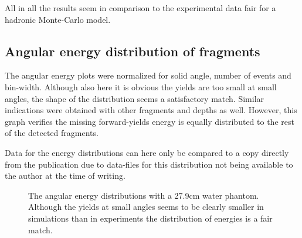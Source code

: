 All in all the results seem in comparison to the experimental data fair for a hadronic Monte-Carlo model.

\subsection{Angular energy distribution of fragments}
The angular energy plots were normalized for solid angle, number of events and bin-width. Although also here it is obvious the yields are too small at small angles, the shape of the distribution seems a satisfactory match. Similar indications were obtained with other fragments and depths as well. However, this graph verifies the missing forward-yields energy is equally distributed to the rest of the detected fragments.

Data for the energy distributions can here only be compared to a copy directly from the publication due to data-files for this distribution not being available to the author at the time of writing.

\begin{figure}[!ht]
\centering
{}
\label{fig:AngularEnergyDistribution}
\caption[Optional caption for list of figures]{The angular energy distributions with a 27.9cm water phantom. Although the yields at small angles seems to be clearly smaller in simulations than in experiments the distribution of energies is a fair match.}
\end{figure}

